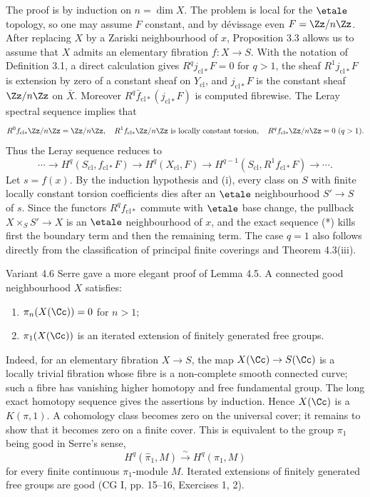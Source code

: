 \begin{prooftext}
The proof is by induction on \(n=\dim X\). The problem is local for the \(\etale\) topology, so one may assume \(F\) constant, and by dévissage even \(F=\Zz/n\Zz\). After replacing \(X\) by a Zariski neighbourhood of \(x\), Proposition 3.3 allows us to assume that \(X\) admits an elementary fibration \(f:X\to S\). With the notation of Definition 3.1, a direct calculation gives \(R^qj_{\mathrm{cl}*}F=0\) for \(q>1\), the sheaf \(R^1j_{\mathrm{cl}*}F\) is extension by zero of a constant sheaf on \(Y_{\mathrm{cl}}\), and \(j_{\mathrm{cl}*}F\) is the constant sheaf \(\Zz/n\Zz\) on \(\bar X\). Moreover \(R^q\bar f_{\mathrm{cl}*}(j_{\mathrm{cl}*}F)\) is computed fibrewise. The Leray spectral sequence implies that
\[
R^0f_{\mathrm{cl}*}\Zz/n\Zz=\Zz/n\Zz,
\quad R^1f_{\mathrm{cl}*}\Zz/n\Zz\text{ is locally constant torsion},
\quad R^qf_{\mathrm{cl}*}\Zz/n\Zz=0\ (q>1).
\]
Thus the Leray sequence reduces to
\[
\cdots\to H^q(S_{\mathrm{cl}},f_{\mathrm{cl}*}F)\to H^q(X_{\mathrm{cl}},F)\to H^{q-1}(S_{\mathrm{cl}},R^1f_{\mathrm{cl}*}F)\to\cdots.
\tag{*}
\]
Let \(s=f(x)\). By the induction hypothesis and (i), every class on \(S\) with finite locally constant torsion coefficients dies after an \(\etale\) neighbourhood \(S'\to S\) of \(s\). Since the functors \(R^qf_{\mathrm{cl}*}\) commute with \(\etale\) base change, the pullback \(X\times_SS'\to X\) is an \(\etale\) neighbourhood of \(x\), and the exact sequence (*) kills first the boundary term and then the remaining term. The case \(q=1\) also follows directly from the classification of principal finite coverings and Theorem 4.3(iii).
\end{prooftext}

\begin{remarktext}{Variant 4.6}
Serre gave a more elegant proof of Lemma 4.5. A connected good neighbourhood \(X\) satisfies:
\begin{enumerate}[label=(\roman*)]
\item \(\pi_n(X(\Cc))=0\) for \(n>1\);
\item \(\pi_1(X(\Cc))\) is an iterated extension of finitely generated free groups.
\end{enumerate}
Indeed, for an elementary fibration \(X\to S\), the map \(X(\Cc)\to S(\Cc)\) is a locally trivial fibration whose fibre is a non-complete smooth connected curve; such a fibre has vanishing higher homotopy and free fundamental group. The long exact homotopy sequence gives the assertions by induction. Hence \(X(\Cc)\) is a \(K(\pi,1)\). A cohomology class becomes zero on the universal cover; it remains to show that it becomes zero on a finite cover. This is equivalent to the group \(\pi_1\) being good in Serre's sense, \ie
\[
H^q(\widehat\pi_1,M)\xrightarrow{\sim}H^q(\pi_1,M)
\]
for every finite continuous \(\pi_1\)-module \(M\). Iterated extensions of finitely generated free groups are good (CG I, pp. 15--16, Exercises 1, 2).
\end{remarktext}

